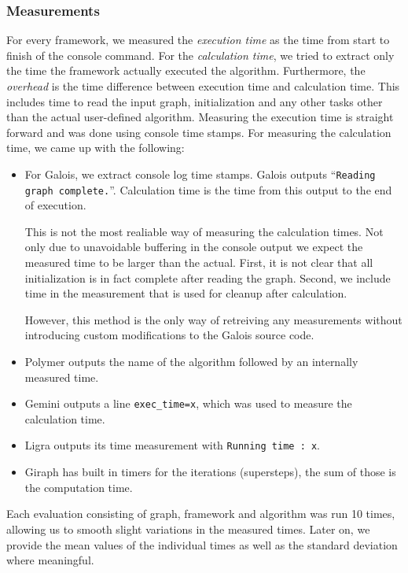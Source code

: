 \subsubsection{Measurements}
For every framework, we measured the \emph{execution time} as the time from start to finish of the console command.
For the \emph{calculation time}, we tried to extract only the time the framework actually executed the algorithm.
Furthermore, the \emph{overhead} is the time difference between execution time and calculation time. This includes time to read the input graph, initialization and any other tasks other than the actual user-defined algorithm.
Measuring the execution time is straight forward and was done using console time stamps.
For measuring the calculation time, we came up with the following:
\begin{itemize}
	\item For Galois, we extract console log time stamps. Galois outputs \enquote{\texttt{Reading graph complete.}}. Calculation time is the time from this output to the end of execution.

	This is not the most realiable way of measuring the calculation times.
	Not only due to unavoidable buffering in the console output we expect the measured time to be larger than the actual.
	First, it is not clear that all initialization is in fact complete after reading the graph. Second, we include time in the measurement that is used for cleanup after calculation.

	However, this method is the only way of retreiving any measurements without introducing custom modifications to the Galois source code.

	\item Polymer outputs the name of the algorithm followed by an internally measured time.

	\item Gemini outputs a line \texttt{exec\_time=x}, which was used to measure the calculation time.

	\item Ligra outputs its time measurement with \texttt{Running time : x}.

	\item Giraph has built in timers for the iterations (supersteps), the sum of those is the computation time.
\end{itemize}
Each evaluation consisting of graph, framework and algorithm was run 10 times, allowing us to smooth slight variations in the measured times.
Later on, we provide the mean values of the individual times as well as the standard deviation where meaningful.
